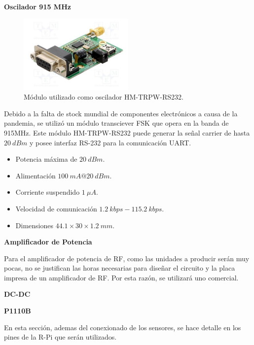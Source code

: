 \textbf{Oscilador 915 MHz}

\begin{figure}[H]
	\centering	
	\includegraphics[width=0.5\textwidth, page=8]{ImagenesIngenieria de Detalle/hmtrpwrs232}
	\caption{Módulo utilizado como oscilador HM-TRPW-RS232.}
	\label{fig:oscilador}
\end{figure}

Debido a la falta de stock mundial de componentes electrónicos a causa de la pandemia, se utilizó un módulo transciever FSK que opera en la banda de 915MHz. Este módulo HM-TRPW-RS232 puede generar la señal carrier de hasta $20 \ dBm$ y posee interfaz RS-232 para la comunicación UART.

\begin{itemize}
	\item Potencia máxima de $20 \ dBm$.
	\item Alimentación $100 \ mA@20 \ dBm$.
	\item Corriente suspendido $1 \ \mu A$.
	\item Velocidad de comunicación $1.2 \ kbps - 115.2 \ kbps$.
	\item Dimensiones $44.1 \times 30  \times 1.2 \ mm$.
\end{itemize}

\textbf{Amplificador de Potencia}

Para el amplificador de potencia de RF, como las unidades a producir serán muy pocas, no se justifican las horas necesarias para diseñar el circuito y la placa impresa de un amplificador de RF. Por esta razón, se utilizará uno comercial. 

\textbf{DC-DC}



\textbf{P1110B}



En esta sección, ademas del conexionado de los sensores, se hace detalle en los pines de la R-Pi que serán utilizados.

